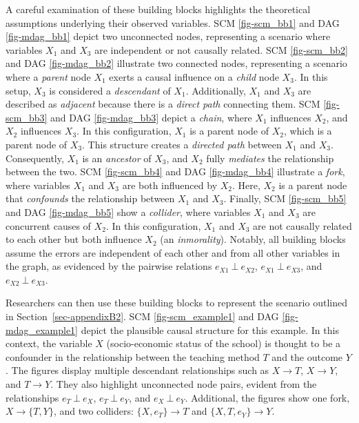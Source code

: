 \documentclass[
  authoryear,
  review,
  1p]{elsarticle}
\begin{document}
A careful examination of these building blocks highlights the
theoretical assumptions underlying their observed variables. SCM
\ref{fig-scm_bb1} and DAG \ref{fig-mdag_bb1} depict two unconnected
nodes, representing a scenario where variables \(X_{1}\) and \(X_{3}\)
are independent or not causally related. SCM \ref{fig-scm_bb2} and DAG
\ref{fig-mdag_bb2} illustrate two connected nodes, representing a
scenario where a \emph{parent} node \(X_{1}\) exerts a causal influence
on a \emph{child} node \(X_{3}\). In this setup, \(X_{3}\) is considered
a \emph{descendant} of \(X_{1}\). Additionally, \(X_{1}\) and \(X_{3}\)
are described as \emph{adjacent} because there is a \emph{direct path}
connecting them. SCM \ref{fig-scm_bb3} and DAG \ref{fig-mdag_bb3} depict
a \emph{chain}, where \(X_{1}\) influences \(X_{2}\), and \(X_{2}\)
influences \(X_{3}\). In this configuration, \(X_{1}\) is a parent node
of \(X_{2}\), which is a parent node of \(X_{3}\). This structure
creates a \emph{directed path} between \(X_{1}\) and \(X_{3}\).
Consequently, \(X_{1}\) is an \emph{ancestor} of \(X_{3}\), and
\(X_{2}\) fully \emph{mediates} the relationship between the two. SCM
\ref{fig-scm_bb4} and DAG \ref{fig-mdag_bb4} illustrate a \emph{fork},
where variables \(X_{1}\) and \(X_{3}\) are both influenced by
\(X_{2}\). Here, \(X_{2}\) is a parent node that \emph{confounds} the
relationship between \(X_{1}\) and \(X_{3}\). Finally, SCM
\ref{fig-scm_bb5} and DAG \ref{fig-mdag_bb5} show a \emph{collider},
where variables \(X_{1}\) and \(X_{3}\) are concurrent causes of
\(X_{2}\). In this configuration, \(X_{1}\) and \(X_{3}\) are not
causally related to each other but both influence \(X_{2}\) (an
\emph{inmorality}). Notably, all building blocks assume the errors are
independent of each other and from all other variables in the graph, as
evidenced by the pairwise relations \(e_{X1} \:\bot\:e_{X2}\),
\(e_{X1} \:\bot\:e_{X3}\), and \(e_{X2} \:\bot\:e_{X3}\).

Researchers can then use these building blocks to represent the scenario
outlined in Section~\ref{sec-appendixB2}. SCM \ref{fig-scm_example1} and
DAG \ref{fig-mdag_example1} depict the plausible causal structure for
this example. In this context, the variable \(X\) (socio-economic status
of the school) is thought to be a confounder in the relationship between
the teaching method \(T\) and the outcome \(Y\). The figures display
multiple descendant relationships such as \(X \rightarrow T\),
\(X \rightarrow Y\), and \(T \rightarrow Y\). They also highlight
unconnected node pairs, evident from the relationships
\(e_{T} \:\bot\:e_{X}\), \(e_{T} \:\bot\:e_{Y}\), and
\(e_{X} \:\bot\:e_{Y}\). Additional, the figures show one fork,
\(X \rightarrow \{T, Y\}\), and two colliders:
\(\{X, e_{T}\} \rightarrow T\) and \(\{X, T, e_{Y}\} \rightarrow Y\).
\end{document}
